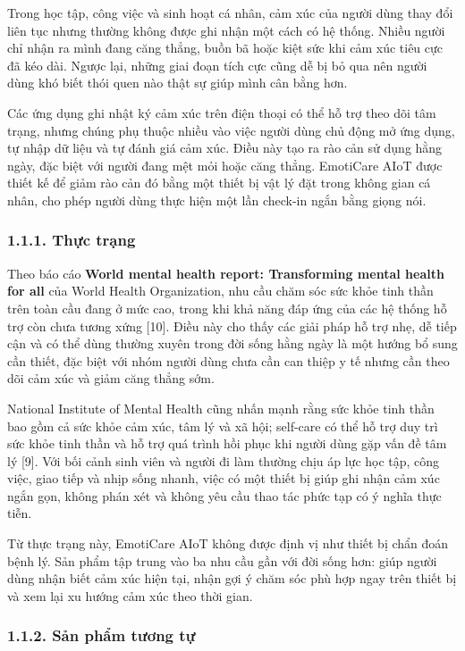 \documentclass[12pt,a4paper]{article}
\begin{document}
Trong học tập, công việc và sinh hoạt cá nhân, cảm xúc của người dùng thay đổi liên tục nhưng thường không được ghi nhận một cách có hệ thống. Nhiều người chỉ nhận ra mình đang căng thẳng, buồn bã hoặc kiệt sức khi cảm xúc tiêu cực đã kéo dài. Ngược lại, những giai đoạn tích cực cũng dễ bị bỏ qua nên người dùng khó biết thói quen nào thật sự giúp mình cân bằng hơn.


Các ứng dụng ghi nhật ký cảm xúc trên điện thoại có thể hỗ trợ theo dõi tâm trạng, nhưng chúng phụ thuộc nhiều vào việc người dùng chủ động mở ứng dụng, tự nhập dữ liệu và tự đánh giá cảm xúc. Điều này tạo ra rào cản sử dụng hằng ngày, đặc biệt với người đang mệt mỏi hoặc căng thẳng. EmotiCare AIoT được thiết kế để giảm rào cản đó bằng một thiết bị vật lý đặt trong không gian cá nhân, cho phép người dùng thực hiện một lần check-in ngắn bằng giọng nói.


\subsubsection*{1.1.1. Thực trạng}

Theo báo cáo \textbf{World mental health report: Transforming mental health for all} của World Health Organization, nhu cầu chăm sóc sức khỏe tinh thần trên toàn cầu đang ở mức cao, trong khi khả năng đáp ứng của các hệ thống hỗ trợ còn chưa tương xứng [10]. Điều này cho thấy các giải pháp hỗ trợ nhẹ, dễ tiếp cận và có thể dùng thường xuyên trong đời sống hằng ngày là một hướng bổ sung cần thiết, đặc biệt với nhóm người dùng chưa cần can thiệp y tế nhưng cần theo dõi cảm xúc và giảm căng thẳng sớm.


National Institute of Mental Health cũng nhấn mạnh rằng sức khỏe tinh thần bao gồm cả sức khỏe cảm xúc, tâm lý và xã hội; self-care có thể hỗ trợ duy trì sức khỏe tinh thần và hỗ trợ quá trình hồi phục khi người dùng gặp vấn đề tâm lý [9]. Với bối cảnh sinh viên và người đi làm thường chịu áp lực học tập, công việc, giao tiếp và nhịp sống nhanh, việc có một thiết bị giúp ghi nhận cảm xúc ngắn gọn, không phán xét và không yêu cầu thao tác phức tạp có ý nghĩa thực tiễn.


Từ thực trạng này, EmotiCare AIoT không được định vị như thiết bị chẩn đoán bệnh lý. Sản phẩm tập trung vào ba nhu cầu gần với đời sống hơn: giúp người dùng nhận biết cảm xúc hiện tại, nhận gợi ý chăm sóc phù hợp ngay trên thiết bị và xem lại xu hướng cảm xúc theo thời gian.


\subsubsection*{1.1.2. Sản phẩm tương tự}
\end{document}
